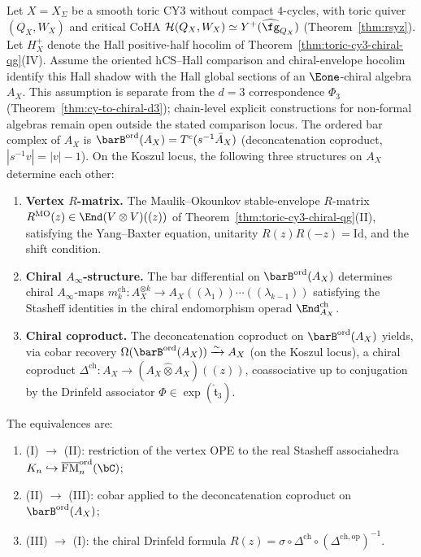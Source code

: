 \begin{theorem}
\label{thm:toric-chiral-qg-specialization}
Let $X = X_\Sigma$ be a smooth toric CY3 without compact $4$-cycles,
with toric quiver $(Q_X, W_X)$ and critical CoHA
$\mathcal{H}(Q_X, W_X) \simeq Y^+(\widehat{\fg}_{Q_X})$
\textup{(}Theorem~\textup{\ref{thm:rsyz}}\textup{)}.
Let $H^+_{X}$ denote the Hall positive-half hocolim of
Theorem~\textup{\ref{thm:toric-cy3-chiral-qg}(IV)}. Assume the
oriented hCS--Hall comparison and chiral-envelope hocolim identify this
Hall shadow with the Hall global sections of an $\Eone$-chiral algebra
$A_X$. This assumption is separate from the $d = 3$ correspondence
$\Phi_3$ (Theorem~\ref{thm:cy-to-chiral-d3}); chain-level explicit
constructions for non-formal algebras remain open outside the stated
comparison locus. The ordered bar complex of $A_X$ is
$\barB^{\mathrm{ord}}(A_X) = T^c(s^{-1}\bar{A}_X)$
\textup{(}deconcatenation coproduct, $|s^{-1}v| = |v| - 1$\textup{)}.
On the Koszul locus, the following three structures on $A_X$
determine each other:
\begin{enumerate}[label=\textup{(\Roman*)}]
 \item \textbf{Vertex $R$-matrix.}
 The Maulik--Okounkov stable-envelope $R$-matrix
 $R^{\mathrm{MO}}(z) \in \End(V \otimes V)((z))$
 of Theorem~\textup{\ref{thm:toric-cy3-chiral-qg}(II)},
 satisfying the Yang--Baxter equation, unitarity
 $R(z)R(-z) = \mathrm{Id}$, and the shift condition.

 \item \textbf{Chiral $A_\infty$-structure.}
 The bar differential on $\barB^{\mathrm{ord}}(A_X)$ determines
 chiral $A_\infty$-maps
 $m_k^{\mathrm{ch}} \colon A_X^{\otimes k}
 \to A_X((\lambda_1))\cdots((\lambda_{k-1}))$
 satisfying the Stasheff identities in the chiral endomorphism
 operad $\End^{\mathrm{ch}}_{A_X}$.

 \item \textbf{Chiral coproduct.}
 The deconcatenation coproduct on $\barB^{\mathrm{ord}}(A_X)$
 yields, via cobar recovery
 $\Omega(\barB^{\mathrm{ord}}(A_X)) \xrightarrow{\sim} A_X$
 \textup{(}on the Koszul locus\textup{)}, a chiral coproduct
 $\Delta^{\mathrm{ch}} \colon A_X \to
 (A_X \mathbin{\hat\otimes} A_X)((z))$,
 coassociative up to conjugation by the Drinfeld associator
 $\Phi \in \exp(\hat{\mathfrak{t}}_3)$.
\end{enumerate}

\medskip\noindent
The equivalences are:
\begin{enumerate}[label=\textup{(\alph*)}]
 \item \textup{(I)} $\to$ \textup{(II)}: restriction of the
 vertex OPE to the real Stasheff associahedra
 $K_n \hookrightarrow
 \overline{\operatorname{FM}}_n^{\mathrm{ord}}(\bC)$;
 \item \textup{(II)} $\to$ \textup{(III)}: cobar applied to
 the deconcatenation coproduct on $\barB^{\mathrm{ord}}(A_X)$;
 \item \textup{(III)} $\to$ \textup{(I)}: the chiral Drinfeld
 formula $R(z) = \sigma \circ \Delta^{\mathrm{ch}}
 \circ (\Delta^{\mathrm{ch}, \mathrm{op}})^{-1}$.
\end{enumerate}


\end{theorem}
